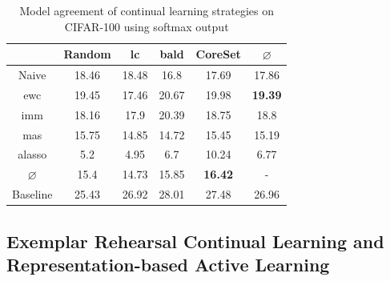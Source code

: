\begin{table}[h]
    \centering
    \begin{tabular}{ c | c c c c | c } 
         & Random & \gls{lc} & \gls{bald} & CoreSet & $\varnothing$\\ 
        \hline
        Naive & 18.46 & 18.48 & 16.8 & 17.69 & 17.86\\
        \gls{ewc} & 19.45 & 17.46 & 20.67 & 19.98 & \textbf{19.39}\\
        \gls{imm} & 18.16 & 17.9 & 20.39 & 18.75 & 18.8\\
        \gls{mas} & 15.75 & 14.85 & 14.72 & 15.45 & 15.19\\
        \gls{alasso} & 5.2 & 4.95 & 6.7 & 10.24 & 6.77\\
        \hline
        $\varnothing$ & 15.4 & 14.73 & 15.85 & \textbf{16.42} & -\\
        Baseline & 25.43 & 26.92 & 28.01 & 27.48 & 26.96 \\
    \end{tabular}
    \caption{Model agreement of continual learning strategies on CIFAR-100 using softmax output}
    \label{fig:ModelStealingCIFAR100Softmax}
\end{table}



\subsection{Exemplar Rehearsal Continual Learning and Representation-based Active Learning}
\label{sec:Evaluation:CALMS:VAAL_AGEM}

